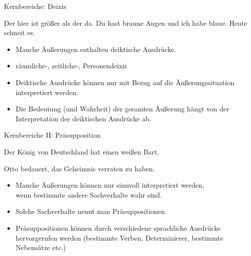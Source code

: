 \begin{frame}{Kernbereiche: Deixis}

\begin{exe}
\ex  Der \alert{hier} ist größer als der \alert{da}.
\ex  \alert{Du} hast braune Augen und \alert{ich} habe blaue.
\ex  \alert{Heute} schneit es.
\end{exe}

\pause

\begin{itemize}
\item Manche Äußerungen enthalten deiktische Ausdrücke.\pause
\item räumliche-, zeitliche-, Personendeixis\pause
\item Deiktische Ausdrücke können nur mit Bezug auf die Äußerungssituation interpretiert werden.\pause
\item Die Bedeutung (und Wahrheit) der gesamten Äußerung hängt von der Interpretation der deiktischen Ausdrücke ab.
\end{itemize}


\end{frame}


 \begin{frame}{Kernbereiche II: Präsupposition}

\begin{exe}     
        \ex Der König von Deutschland hat einen weißen Bart.\\


        \ex Otto bedauert, das Geheimnis verraten zu haben.\\


\end{exe}



\begin{itemize}
\item Manche Äußerungen können nur sinnvoll interpretiert werden,\\
      wenn bestimmte andere Sachverhalte wahr sind.\pause
\item Solche Sachverhalte nennt man \alert{Präsuppositionen}. \pause
\item Präsuppositionen können durch verschiedene sprachliche Ausdrücke hervorgerufen werden (bestimmte Verben, Determinierer, bestimmte Nebensätze etc.)
\end{itemize}

\end{frame}




